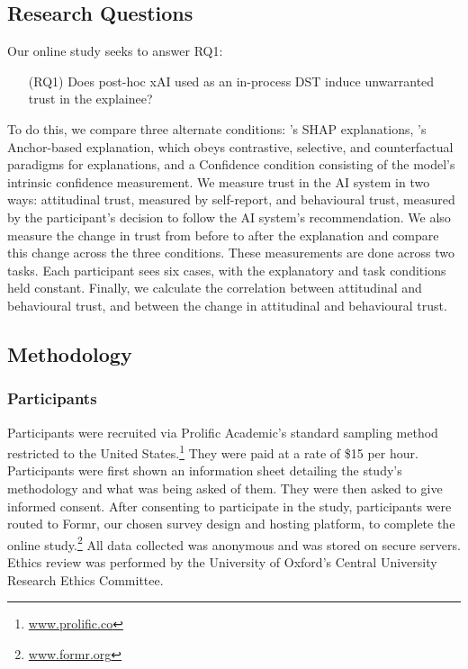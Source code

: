 \subsection{Research Questions}
Our online study seeks to answer RQ1:

\begin{enumerate}
    \item[(RQ1)] Does post-hoc xAI used as an in-process DST induce unwarranted trust in the explainee?
\end{enumerate}

To do this, we compare three alternate conditions: \textcite{lundberg_unified_2017}'s SHAP explanations, \textcite{ribeiro_anchors_2018}'s Anchor-based explanation, which obeys contrastive, selective, and counterfactual paradigms for explanations, and a Confidence condition consisting of the model's intrinsic confidence measurement. We measure trust in the AI system in two ways: attitudinal trust, measured by self-report, and behavioural trust, measured by the participant's decision to follow the AI system's recommendation. We also measure the change in trust from before to after the explanation and compare this change across the three conditions. These measurements are done across two tasks. Each participant sees six cases, with the explanatory and task conditions held constant. Finally, we calculate the correlation between attitudinal and behavioural trust, and between the change in attitudinal and behavioural trust.

\subsection{Methodology}
\subsubsection{Participants}\label{ssec:participants}
Participants were recruited via Prolific Academic's standard sampling method restricted to the United States.\footnote{\url{www.prolific.co}} They were paid at a rate of \$15 per hour. Participants were first shown an information sheet detailing the study's methodology and what was being asked of them. They were then asked to give informed consent. After consenting to participate in the study, participants were routed to Formr, our chosen survey design and hosting platform, to complete the online study.\footnote{\url{www.formr.org}} All data collected was anonymous and was stored on secure servers. Ethics review was performed by the University of Oxford's Central University Research Ethics Committee.

